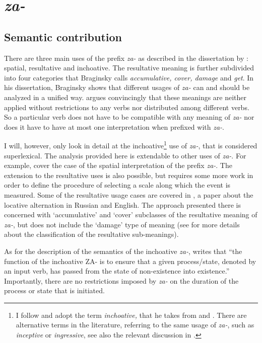 \section{\textit{za-}}\label{subsection:semantics:za}
\subsection{Semantic contribution}
There are three main uses of the prefix \textit{za-} as described in the dissertation by \citet{Braginsky:08}: spatial, resultative and inchoative. The resultative meaning is further subdivided into four categories that Braginsky calls \textit{accumulative, cover, damage} and \textit{get}. In his dissertation, Braginsky shows that different usages of \textit{za-} can and should be analyzed in a unified way. \citet{Braginsky:08} argues convincingly that these meanings are neither applied without restrictions to any verbs nor distributed among different verbs. So a particular verb does not have to be compatible with any meaning of \textit{za-} nor does it have to have at most one interpretation when prefixed with \textit{za-}.

I will, however, only look in detail at the inchoative\footnote{I follow \citet{Braginsky:08} and adopt the term \textit{inchoative,} that he takes from \citealt{Zemskaja:55} and \citealt{Zaliznjak:95}. There are alternative terms in the literature, referring to the same usage of \textit{za-}, such as \textit{inceptive} or \textit{ingressive}, see also the relevant discussion in \citealt{Maslov:65}.} use of \textit{za-}, that is considered superlexical. The analysis provided here is extendable to other uses of \textit{za-}. For example, \cite{ZinovaOsswald:paper} cover the case of the spatial interpretation of the prefix \textit{za-}. The extension to the resultative uses is also possible, but requires some more work in order to define the procedure of selecting a scale along which the event is measured. Some of the resultative usage cases are covered in \citet{Zinova:14}, a paper about the locative alternation in Russian and English. The approach presented there is concerned with `accumulative' and `cover' subclasses of the resultative meaning of \textit{za-}, but does not include the `damage' type of meaning (see \citealt{Braginsky:08} for more details about the classification of the resultative sub-meanings).

As for the description of the semantics of the inchoative \textit{za-}, \citet{Braginsky:08} writes \citep[also referring to the work of][]{Sheljakin:69} that ``the function of the inchoative ZA- is to ensure that a given process\slash state, denoted by an input verb, has passed from the state of non-existence into existence.'' Importantly, there are no restrictions imposed by \textit{za-} on the duration of the process or state that is initiated.

